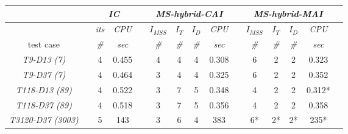 \begin{table}[!ht]
\begin{adjustbox}{width=1\textwidth}
\begin{tabular}{@{}l c cc c  cccc c cccc c  @{}}
\toprule 
\end{tabular}
\end{adjustbox}
\begin{adjustbox}{width=1\textwidth} %
\small
\begin{tabular}{@{}l c cc c  cccc c cccc c  @{}}\toprule
                               && \multicolumn{2}{c}{\textit{IC}} &&     \multicolumn{4}{c}{\textit{MS-hybrid-CAI}} && \multicolumn{4}{c}{\textit{MS-hybrid-MAI}} \\ \midrule 
\multicolumn{1}{l}{}        && \textit{its}      & \textit{CPU} && $I_{MSS}$      & $I_T$   &  $I_D$      & \textit{CPU}     &&$I_{MSS}$      & $I_T$   &  $I_D$      & \textit{CPU}      \\
\cmidrule{3-4}  \cmidrule{6-9}  \cmidrule{11-14}   
\multicolumn{1}{c}{test case}      && \textit{\#}       & \textit{sec} && \textit{\#}      & \textit{\#}    & \textit{\#}       & \textit{sec}     && \textit{\#}        & \textit{\#}     &  \textit{\#}       & \textit{sec}  \\
\midrule
\multicolumn{1}{c}{\textit{T9-D13 (7)}}         && 4 & {0.455 } && 4       & 4  & 4 & 0.308 && 6      & 2  & 2 & 0.323  \\
\multicolumn{1}{c}{\textit{T9-D37 (7)}}         && 4 & 0.464    && 3      & 4  & 4 & 0.325 && 6      & 2  & 2 & 0.352  \\
\multicolumn{1}{c}{{\textit{T118-D13 (89)}}}    && 4 & 0.522    && 3      & 7 & 5 & 0.348 && 4 & 2  & 2 & {0.312*} \\
\multicolumn{1}{c}{{\textit{T118-D37 (89)}}}    && 4 & 0.518    && 3      & 7 & 5 & 0.356 && 4 & 2  & 2 & {0.358}\\
\multicolumn{1}{c}{{\textit{T3120-D37 (3003)}}} && 5 & 143      && 3      & 6  & 4  & 383 && 6*  & 2*  & 2* & {235*}  \\
\toprule 
\end{tabular}
\end{adjustbox}
\end{table}